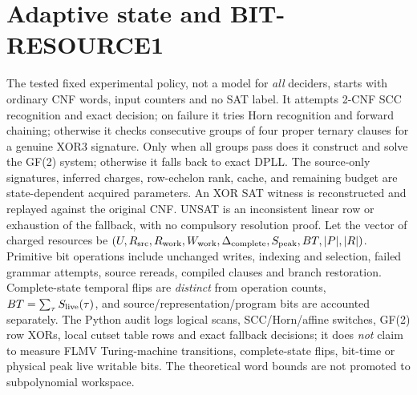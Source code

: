 \documentclass[11pt]{article}
\begin{document}
\section{Adaptive state and BIT-RESOURCE1}
The tested fixed experimental policy, not a model for \emph{all} deciders, starts with ordinary CNF words, input counters and no SAT label. It attempts 2-CNF SCC recognition and exact decision; on failure it tries Horn recognition and forward chaining; otherwise it checks consecutive groups of four proper ternary clauses for a genuine XOR3 signature. Only when all groups pass does it construct and solve the GF(2) system; otherwise it falls back to exact DPLL. The source-only signatures, inferred charges, row-echelon rank, cache, and remaining budget are state-dependent acquired parameters. An XOR SAT witness is reconstructed and replayed against the original CNF. UNSAT is an inconsistent linear row or exhaustion of the fallback, with no compulsory resolution proof.
Let the vector of charged resources be $(U,R_{\rm src},R_{\rm work},W_{\rm work},\Delta_{\rm complete},S_{\rm peak},BT,|P|,|R|)$. Primitive bit operations include unchanged writes, indexing and selection, failed grammar attempts, source rereads, compiled clauses and branch restoration. Complete-state temporal flips are \emph{distinct} from operation counts, $BT=\sum_\tau S_{\rm live}(\tau)$, and source/representation/program bits are accounted separately. The Python audit logs logical scans, SCC/Horn/affine switches, GF(2) row XORs, local cutset table rows and exact fallback decisions; it does \emph{not} claim to measure FLMV Turing-machine transitions, complete-state flips, bit-time or physical peak live writable bits. The theoretical word bounds are not promoted to subpolynomial workspace.
\end{document}
